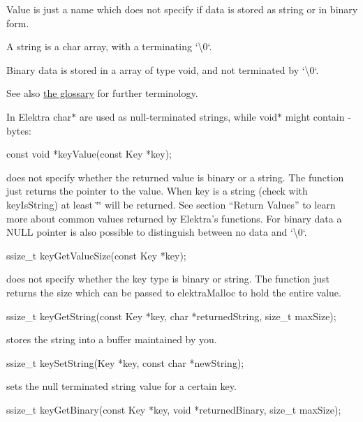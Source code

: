 \begin{DoxyItemize}
\item Value is just a name which does not specify if data is stored as string or in binary form.
\item A string is a char array, with a terminating `\textquotesingle{}\textbackslash{}0\textquotesingle{}`.
\item Binary data is stored in a array of type void, and not terminated by `\textquotesingle{}\textbackslash{}0\textquotesingle{}`.
\end{DoxyItemize}

See also \hyperlink{doc_help_elektra-glossary_md}{the glossary} for further terminology.

In Elektra {\ttfamily char$\ast$} are used as null-\/terminated strings, while {\ttfamily void$\ast$} might contain {}-\/bytes\+: \begin{DoxyVerb}const void *keyValue(const Key *key);
\end{DoxyVerb}


does not specify whether the returned value is binary or a string. The function just returns the pointer to the value. When {\ttfamily key} is a string (check with {\ttfamily key\+Is\+String}) at least {\ttfamily \char`\"{}\char`\"{}} will be returned. See section “\+Return Values” to learn more about common values returned by Elektra’s functions. For binary data a {\ttfamily N\+U\+LL} pointer is also possible to distinguish between no data and `\textquotesingle{}\textbackslash{}0\textquotesingle{}`. \begin{DoxyVerb}ssize_t keyGetValueSize(const Key *key);
\end{DoxyVerb}


does not specify whether the key type is binary or string. The function just returns the size which can be passed to {\ttfamily elektra\+Malloc} to hold the entire value. \begin{DoxyVerb}ssize_t keyGetString(const Key *key, char *returnedString, size_t maxSize);
\end{DoxyVerb}


stores the string into a buffer maintained by you. \begin{DoxyVerb}ssize_t keySetString(Key *key, const char *newString);
\end{DoxyVerb}


sets the null terminated string value for a certain key. \begin{DoxyVerb}ssize_t keyGetBinary(const Key *key, void *returnedBinary, size_t maxSize);
\end{DoxyVerb}


